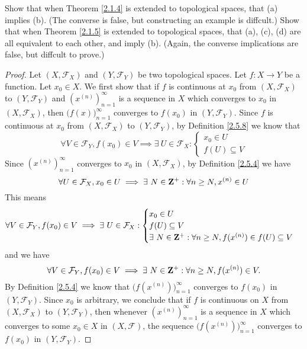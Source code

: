 \begin{exercise}\label{ex 2.5.16}
    Show that when Theorem \ref{2.1.4} is extended to topological spaces, that (a) implies (b).
    (The converse is false, but constructing an example is diffcult.)
    Show that when Theorem \ref{2.1.5} is extended to topological spaces, that (a), (c), (d) are all equivalent to each other, and imply (b).
    (Again, the converse implications are false, but diffcult to prove.)
\end{exercise}

\begin{proof}
    Let \((X, \mathcal{F}_X)\) and \((Y, \mathcal{F}_Y)\) be two topological spaces.
    Let \(f : X \to Y\) be a function.
    Let \(x_0 \in X\).
    We first show that if \(f\) is continuous at \(x_0\) from \((X, \mathcal{F}_X)\) to \((Y, \mathcal{F}_Y)\) and \((x^{(n)})_{n = 1}^\infty\) is a sequence in \(X\) which converges to \(x_0\) in \((X, \mathcal{F}_X)\), then \(\big(f(x)\big)_{n = 1}^\infty\) converges to \(f(x_0)\) in \((Y, \mathcal{F}_Y)\).
    Since \(f\) is continuous at \(x_0\) from \((X, \mathcal{F}_X)\) to \((Y, \mathcal{F}_Y)\), by Definition \ref{2.5.8} we know that
    \[
        \forall V \in \mathcal{F}_Y, f(x_0) \in V \implies \exists\ U \in \mathcal{F}_X : \begin{cases}
            x_0 \in U \\
            f(U) \subseteq V
        \end{cases}
    \]
    Since \((x^{(n)})_{n = 1}^\infty\) converges to \(x_0\) in \((X, \mathcal{F}_X)\), by Definition \ref{2.5.4} we have
    \[
        \forall U \in \mathcal{F}_X, x_0 \in U \implies \exists\ N \in \mathbf{Z}^+ : \forall n \geq N, x^{(n)} \in U
    \]
    This means
    \[
        \forall V \in \mathcal{F}_Y, f(x_0) \in V \implies \exists\ U \in \mathcal{F}_X : \begin{cases}
            x_0 \in U        \\
            f(U) \subseteq V \\
            \exists\ N \in \mathbf{Z}^+ : \forall n \geq N, f(x^{(n)}) \in f(U) \subseteq V
        \end{cases}
    \]
    and we have
    \[
        \forall V \in \mathcal{F}_Y, f(x_0) \in V \implies \exists\ N \in \mathbf{Z}^+ : \forall n \geq N, f(x^{(n)}) \in V.
    \]
    By Definition \ref{2.5.4} we know that \(\big(f(x^{(n)})\big)_{n = 1}^\infty\) converges to \(f(x_0)\) in \((Y, \mathcal{F}_Y)\).
    Since \(x_0\) is arbitrary, we conclude that if \(f\) is continuous on \(X\) from \((X, \mathcal{F}_X)\) to \((Y, \mathcal{F}_Y)\), then whenever \((x^{(n)})_{n = 1}^\infty\) is a sequence in \(X\) which converges to some \(x_0 \in X\) in \((X, \mathcal{F})\), the sequence \(\big(f(x^{(n)})\big)_{n = 1}^\infty\) converges to \(f(x_0)\) in \((Y, \mathcal{F}_Y)\).


\end{proof}
